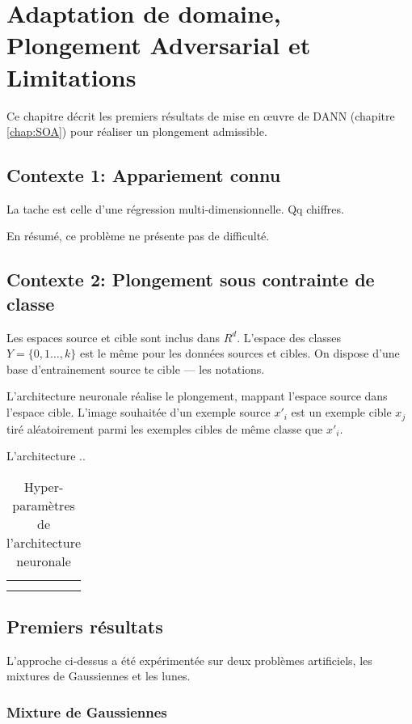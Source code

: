 \chapter{Adaptation de domaine, Plongement Adversarial et Limitations}
\label{chap:tranche1}

Ce chapitre décrit les premiers résultats de mise en \oe uvre de DANN (chapitre \ref{chap:SOA}) pour réaliser un plongement admissible. 

\section{Contexte 1: Appariement connu}
La tache est celle d'une régression multi-dimensionnelle. 
Qq chiffres. 

En résumé, ce problème ne présente pas de difficulté.

\section{Contexte 2: Plongement sous contrainte de classe}

Les espaces source et cible sont inclus dans $R^d$. L'espace des classes $Y=\{0,1 \ldots, k\}$ est le même pour les données sources et cibles. 
On dispose d'une base d'entrainement source te cible --- les notations.

L'architecture neuronale réalise le plongement, mappant l'espace source dans l'espace cible. 
L'image souhaitée d'un exemple source $x'_i$ est un exemple cible $x_j$ tiré aléatoirement parmi les exemples cibles de même classe que $x'_i$. 

L'architecture .. 
\begin{table}
\centering
\begin{tabular}{c|c}
 &  \\
 & 
\end{tabular}
\caption{Hyper-paramètres de l'architecture neuronale}
\label{tab:DANN-hp}
\end{table}

\section{Premiers résultats}
L'approche ci-dessus a été expérimentée sur deux problèmes artificiels, les mixtures de Gaussiennes et les lunes. 

\subsection{Mixture de Gaussiennes}

